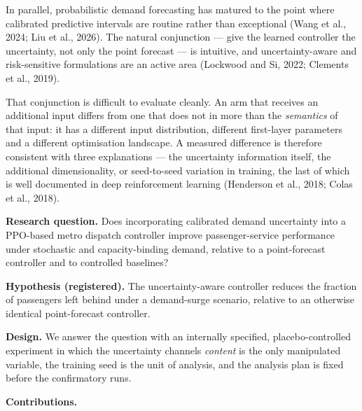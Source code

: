 \documentclass[
]{article}
\begin{document}
In parallel, probabilistic demand forecasting has matured to the point
where calibrated predictive intervals are routine rather than
exceptional (Wang et al., 2024; Liu et al., 2026). The natural
conjunction --- give the learned controller the uncertainty, not only
the point forecast --- is intuitive, and uncertainty-aware and
risk-sensitive formulations are an active area (Lockwood and Si, 2022;
Clements et al., 2019).

That conjunction is difficult to evaluate cleanly. An arm that receives
an additional input differs from one that does not in more than the
\emph{semantics} of that input: it has a different input distribution,
different first-layer parameters and a different optimisation landscape.
A measured difference is therefore consistent with three explanations
--- the uncertainty information itself, the additional dimensionality,
or seed-to-seed variation in training, the last of which is well
documented in deep reinforcement learning (Henderson et al., 2018; Colas
et al., 2018).

\textbf{Research question.} Does incorporating calibrated demand
uncertainty into a PPO-based metro dispatch controller improve
passenger-service performance under stochastic and capacity-binding
demand, relative to a point-forecast controller and to controlled
baselines?

\textbf{Hypothesis (registered).} The uncertainty-aware controller
reduces the fraction of passengers left behind under a demand-surge
scenario, relative to an otherwise identical point-forecast controller.

\textbf{Design.} We answer the question with an internally specified,
placebo-controlled experiment in which the uncertainty
channel\textquotesingle s \emph{content} is the only manipulated
variable, the training seed is the unit of analysis, and the analysis
plan is fixed before the confirmatory runs.

\textbf{Contributions.}
\end{document}

